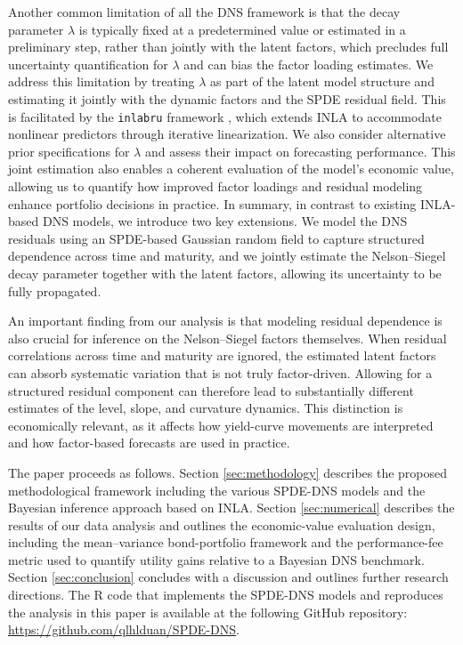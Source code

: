 \documentclass[
  12pt]{article}
\begin{document}
Another common limitation of all the DNS framework is that the decay parameter $\lambda$ is typically fixed at a predetermined value or estimated in a preliminary step, rather than jointly with the latent factors, which precludes full uncertainty quantification for $\lambda$ and can bias the factor loading estimates. We address this limitation by treating $\lambda$ as part of the latent model structure and estimating it jointly with the dynamic factors and the SPDE residual field. This is facilitated by the \texttt{inlabru} framework \citep{lindgren2024inlabru}, which extends INLA to accommodate nonlinear predictors through iterative {linearization}. We also {consider} alternative prior specifications for $\lambda$ and {assess} their impact on forecasting performance. This joint estimation also enables a coherent evaluation of the model’s economic value, allowing us to quantify how improved factor loadings and residual modeling enhance portfolio decisions in practice. In summary, in contrast to existing INLA-based DNS models, we introduce two key extensions. We model the DNS residuals using an SPDE-based Gaussian random field to capture structured dependence across time and maturity, and we jointly estimate the Nelson–Siegel decay parameter together with the latent factors, allowing its uncertainty to be fully propagated.

An important finding from our analysis is that modeling residual dependence is also crucial for inference on the Nelson–Siegel factors themselves. When residual correlations across time and maturity are ignored, the estimated latent factors can absorb systematic variation that is not truly factor-driven. Allowing for a structured residual component can therefore lead to substantially different estimates of the level, slope, and curvature dynamics. This distinction is economically relevant, as it affects how yield-curve movements are interpreted and how factor-based forecasts are used in practice.

The paper proceeds as follows. Section \ref{sec:methodology} describes the proposed methodological framework including the various SPDE-DNS models and the Bayesian inference approach based on INLA. Section \ref{sec:numerical} describes the results of our data analysis and outlines the economic-value evaluation design, including the mean--variance bond-portfolio framework and the performance-fee metric used to quantify utility gains relative to a Bayesian DNS benchmark. Section \ref{sec:conclusion} concludes with a discussion and outlines further research directions. The R code that implements the SPDE-DNS models and reproduces the analysis in this paper is available at the following GitHub repository: \url{https://github.com/qlhlduan/SPDE-DNS}.
\end{document}
